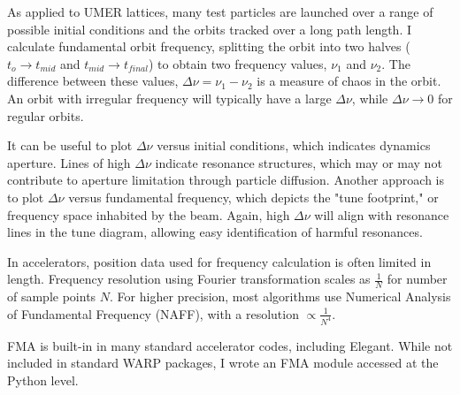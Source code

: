As applied to UMER lattices, many test particles are launched over a range of possible initial conditions and the orbits tracked over a long path length. I calculate fundamental orbit frequency, splitting the orbit into two halves ($t_o \to t_{mid}$ and $t_{mid} \to t_{final}$) to obtain two frequency values, $\nu_1$ and $\nu_2$. The difference between these values, $\Delta \nu = \nu_1-\nu_2$ is a measure of chaos in the orbit. An orbit with irregular frequency will typically have a large $\Delta \nu$, while $\Delta \nu \to 0$ for regular orbits. 

It can be useful to plot $\Delta \nu $ versus initial conditions, which indicates dynamics aperture. Lines of high $\Delta \nu$ indicate resonance structures, which may or may not contribute to aperture limitation through particle diffusion. Another approach is to plot $\Delta \nu $ versus fundamental frequency, which depicts the "tune footprint," or frequency space inhabited by the beam. Again, high $\Delta \nu$ will align with resonance lines in the tune diagram, allowing easy identification of harmful resonances. 

In accelerators, position data used for frequency calculation is often limited in length. Frequency resolution using Fourier transformation scales as $\frac{1}{N}$ for number of sample points $N$. For higher precision, most algorithms use Numerical Analysis of Fundamental Frequency (NAFF), with a resolution $\propto \frac{1}{N^4}$. 




FMA is built-in in many standard accelerator codes, including Elegant. While not included in standard WARP packages, I wrote an FMA module accessed at the Python level. 